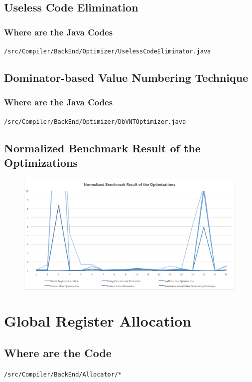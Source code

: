 \documentclass[a4paper]{article}
\begin{document}
\subsection{Useless Code Elimination}
\subsubsection{Where are the Java Codes}
\noindent
\texttt{/src/Compiler/BackEnd/Optimizer/UselessCodeEliminator.java}

\subsection{Dominator-based Value Numbering Technique}
\subsubsection{Where are the Java Codes}
\noindent
\texttt{/src/Compiler/BackEnd/Optimizer/DbVNTOptimizer.java}

\subsection{Normalized Benchmark Result of the Optimizations}
\begin{figure}[!htp]
	\includegraphics[width=\textwidth]{../presentation/image/benchmark/optimization}
\end{figure}

\section{Global Register Allocation}
\subsection{Where are the Code}
\noindent
\texttt{/src/Compiler/BackEnd/Allocator/*}
\end{document}
